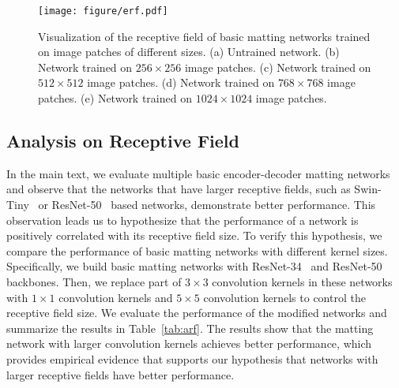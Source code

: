 \documentclass[10pt,twocolumn,letterpaper]{article}
\begin{document}
\begin{figure}[!t]
    \begin{center}
    \texttt{[image: figure/erf.pdf]}
       \end{center}
            \vspace{-15pt}
    \caption{ Visualization of the receptive field of basic matting networks trained on image patches of different sizes. (a) Untrained network. (b) Network trained on $256 \times 256$ image patches. (c) Network trained on $512 \times 512$ image patches. (d) Network trained on $768 \times 768$ image patches. (e) Network trained on $1024 \times 1024$ image patches. }
    \label{fig:rf}
    \vspace{-5pt}
\end{figure}


\subsection{Analysis on Receptive Field}
In the main text, we evaluate multiple basic encoder-decoder matting networks and observe that the networks that have larger receptive fields, such as Swin-Tiny~\cite{liu2021Swin} or ResNet-50~\cite{he2016deep} based networks, demonstrate better performance. 
This observation leads us to hypothesize that the performance of a network is positively correlated with its receptive field size. 
To verify this hypothesis, we compare the performance of basic matting networks with different kernel sizes.
Specifically, we build basic matting networks with ResNet-34~\cite{he2016deep} and ResNet-50 backbones. 
Then, we replace part of $3 \times 3$  convolution kernels in these networks with $1 \times 1$ convolution kernels and  $5 \times 5$  convolution kernels to control the receptive field size.
We evaluate the performance of the modified networks and summarize the results in Table~\ref{tab:arf}.
The results show that the matting network with larger convolution kernels achieves better performance, which provides empirical evidence that supports our hypothesis that networks with larger receptive fields have better performance.
\end{document}
